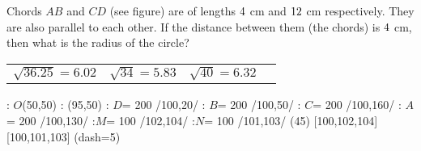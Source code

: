 

\DIVIDE{}\vp
\DIVIDE{}\vq
\SQUARE\vp\vj
\SQUARE\vq\vk
\SUBTRACT\vk\vj\vl

\EXPR[2]
\SQUARE\vz\vx
\ADD\vx\vk\vw
\SQUAREROOT\vw\vv
\ROUND[2]\vv\vu

\question[3] Chords $AB$ and $CD$ (see figure) are of lengths $4$ cm and $12$ cm respectively. They are also 
parallel to each other. If the distance between them (the chords) is $4$ cm, then what is 
the radius of the circle? 

\watchout

\begin{calcaid}
  \begin{tabular}{c c c c}
    $\sqrt{36.25}=6.02$ & $\sqrt{34}=5.83$ & $\sqrt{40}=6.32$
  \end{tabular}
\end{calcaid}

  \large
  : $O$(50,50)
  : (95,50) %
  : $D$= 200 /100,20/
  : $B$= 200 /100,50/
  : $C$= 200 /100,160/
  : $A$= 200 /100,130/
  :$M$= 100 /102,104/
  :$N$= 100 /101,103/
\figdrawbegin{}
  (45)
  \figdrawline [101,103]
  \figdrawline [102,104]
   [100,102,104]
   [100,101,103]
  \ifprintanswers
    \figset (dash=5)
    \figdrawline [100,101]
    \figdrawline [100,102]
  \fi
\figdrawend
{}

\ifprintanswers
  \begin{marginfigure}
    \centerline{\box\figBoxA}
  \end{marginfigure}
\else
  \vspace{1cm}
  \centerline{\box\figBoxA}
\fi

